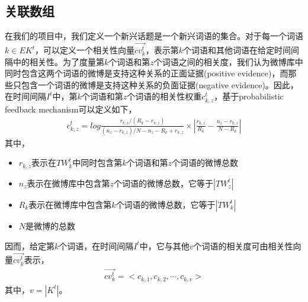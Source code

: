 \documentclass[a4paper]{article}
\begin{document}
\subsection{关联数组}
在我们的项目中，我们定义一个新兴话题是一个新兴词语的集合。对于每一个词语$k\in EK^t$，可以定义一个相关性向量$\vec{cv_k^t}$，表示第$k$个词语和其他词语在给定时间间隔中的相关性。为了度量第$k$个词语和第$z$个词语之间的相关度，我们认为微博库中同时包含这两个词语的微博是支持这种关系的正面证据(positive evidence)，而那些只包含一个词语的微博是支持这种关系的负面证据(negative evidence)。因此，在时间间隔$I^t$中，第$k$个词语和第$z$个词语的相关性权重$c_{k,z}^t$，基于probabilistic feedback mechanism可以定义如下，
\begin{align}
    c_{k,z}^t=log \frac{ {r_{k,z}} / (R_k-r_{k,z}) } { (n_z-r_{k,z}) / {N-n_z-R_k+r_{k,z}} } \times |\frac {r_{k,z}} {R_k} - \frac {n_z-r_{k,z}} {N-R_k}|
\end{align}
其中，
\begin{itemize}
    \item $r_{k,z}$表示在$TW_k^t$中同时包含第$k$个词语和第$z$个词语的微博总数
    \item $n_z$表示在微博库中包含第$z$个词语的微博总数，它等于$|TW_z^t|$
    \item $R_k$表示在微博库中包含第$k$个词语的微博总数，它等于$|TW_k^t|$
    \item $N$是微博的总数
\end{itemize}
因而，给定第$k$个词语，在时间间隔$I^t$中，它与其他$v$个词语的相关度可由相关性向量$\vec{cv_k^t}$表示，
\begin{align}
    \vec{cv_k^t}=<c_{k,1}, c_{k,2}, \cdots, c_{k,v}>
\end{align}
其中，$v=|K^t|$。
\end{document}
